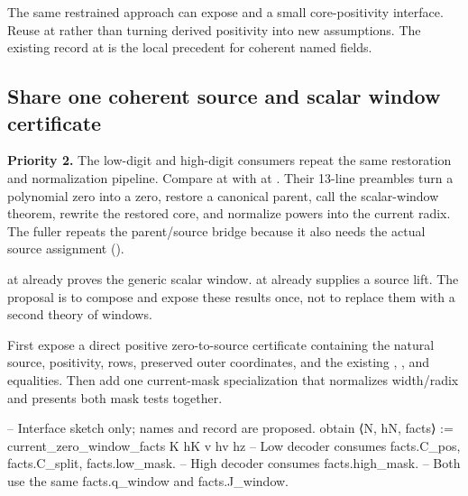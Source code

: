 The same restrained approach can expose  and a
small core-positivity interface. Reuse  at
 rather than turning derived positivity into
new assumptions. The existing 
record at  is the local
precedent for coherent named fields.

\subsection{Share one coherent source and scalar window certificate}
\label{sec:window}

\textbf{Priority 2.} The low-digit and high-digit consumers repeat the same
restoration and normalization pipeline. Compare
 at
 with
 at
. Their 13-line preambles turn a
polynomial zero into a  zero, restore a canonical
parent, call the scalar-window theorem, rewrite the restored core, and
normalize powers into the current radix. The fuller
 repeats the parent/source bridge because it
also needs the actual source assignment
().

\existing{}  at
 already proves the generic scalar
window.  at
 already supplies a source lift.
The proposal is to compose and expose these results once, not to replace
them with a second theory of windows.

\proposed{} First expose a direct positive  zero-to-source
certificate containing the natural source, positivity, rows, preserved outer
coordinates, and the existing , , and
 equalities. Then add one current-mask specialization
that normalizes width/radix and presents both mask tests together.

\begin{Lean}
-- Interface sketch only; names and record are proposed.
obtain ⟨N, hN, facts⟩ := current_zero_window_facts K hK v hv hz
-- Low decoder consumes facts.C_pos, facts.C_split, facts.low_mask.
-- High decoder consumes facts.high_mask.
-- Both use the same facts.q_window and facts.J_window.
\end{Lean}

